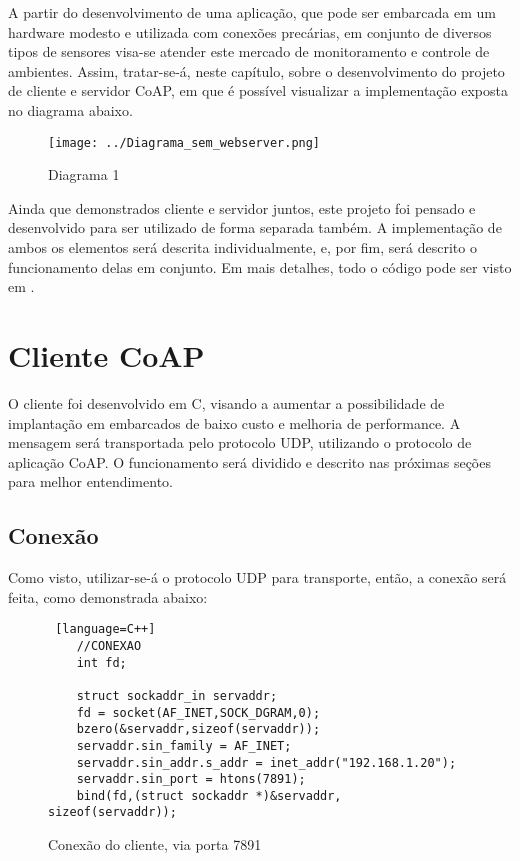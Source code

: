 A partir do desenvolvimento de uma aplicação, que pode ser embarcada em um hardware modesto e utilizada com conexões precárias, em conjunto de diversos tipos de sensores visa-se atender este mercado de monitoramento e controle de ambientes. Assim, tratar-se-á, neste capítulo, sobre o desenvolvimento do projeto de cliente e servidor CoAP, em que é possível visualizar a implementação exposta no diagrama abaixo.

\begin{figure}[!htb]
	\centering
	\texttt{[image: ../Diagrama\_sem\_webserver.png]}
	\caption{Diagrama 1}
	\label{fig:Diagrama_lin_emb}
\end{figure}


Ainda que demonstrados cliente e servidor juntos, este projeto foi pensado e desenvolvido para ser utilizado de forma separada também. A implementação de ambos os elementos será descrita individualmente, e, por fim, será descrito o funcionamento delas em conjunto. Em mais detalhes, todo o código pode ser visto em \cite{cliente_servidor_coap}.

\section{Cliente CoAP}
O cliente foi desenvolvido em C, visando a aumentar a possibilidade de implantação em embarcados de baixo custo e melhoria de performance. A mensagem será transportada pelo protocolo UDP, utilizando o protocolo de aplicação CoAP. O funcionamento será dividido e descrito nas próximas seções para melhor entendimento.


\subsection{Conexão}
Como visto, utilizar-se-á o protocolo UDP para transporte, então, a conexão será feita, como demonstrada abaixo:

\begin{figure}[!htb]
	\begin{lstlisting} [language=C++]
	//CONEXAO
	int fd;
	
	struct sockaddr_in servaddr;
	fd = socket(AF_INET,SOCK_DGRAM,0);
	bzero(&servaddr,sizeof(servaddr));
	servaddr.sin_family = AF_INET;
	servaddr.sin_addr.s_addr = inet_addr("192.168.1.20");
	servaddr.sin_port = htons(7891);
	bind(fd,(struct sockaddr *)&servaddr, sizeof(servaddr));
	\end{lstlisting}
	\caption{Conexão do cliente, via porta 7891}
	\label{code:conexao_cliente}
\end{figure}

